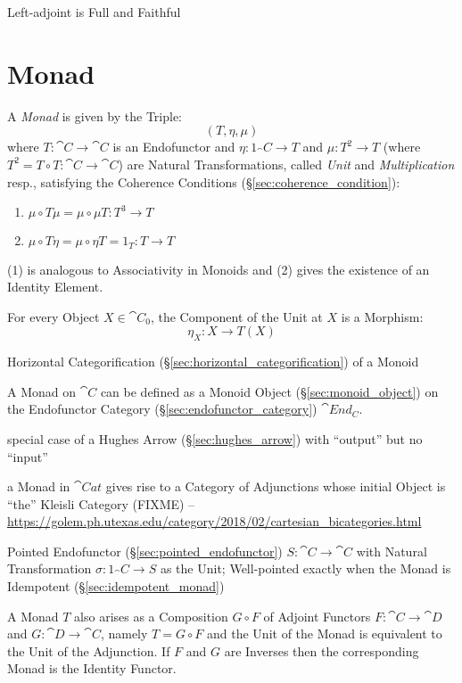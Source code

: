\cite{winskel-nielsen93}

Left-adjoint is Full and Faithful



\section{Monad}\label{sec:monad}

A \emph{Monad} is given by the Triple:
\[
  (T, \eta, \mu)
\]
where $T : \cat{C} \rightarrow \cat{C}$ is an Endofunctor and $\eta :
1_\cat{C} \rightarrow T$ and $\mu : T^2 \rightarrow T$ (where $T^2 = T
\circ T : \cat{C} \rightarrow \cat{C}$) are Natural Transformations,
called \emph{Unit} and \emph{Multiplication} resp., satisfying the
Coherence Conditions (\S\ref{sec:coherence_condition}):
\begin{enumerate}
  \item $\mu \circ T\mu = \mu \circ \mu T : T^3 \rightarrow T$
  \item $\mu \circ T\eta = \mu \circ \eta T = 1_T : T \rightarrow T$
\end{enumerate}
(1) is analogous to Associativity in Monoids and (2) gives the
existence of an Identity Element.

For every Object $X \in \cat{C}_0$, the Component of the Unit at $X$
is a Morphism:
\[
  \eta_X : X \rightarrow T (X)
\]

Horizontal Categorification (\S\ref{sec:horizontal_categorification})
of a Monoid

A Monad on $\cat{C}$ can be defined as a Monoid Object
(\S\ref{sec:monoid_object}) on the Endofunctor Category
(\S\ref{sec:endofunctor_category}) $\cat{End_C}$.

special case of a Hughes Arrow (\S\ref{sec:hughes_arrow}) with
``output'' but no ``input''

a Monad in $\cat{Cat}$ gives rise to a Category of Adjunctions whose initial
Object is ``the'' Kleisli Category (FIXME)
--\url{https://golem.ph.utexas.edu/category/2018/02/cartesian_bicategories.html}

Pointed Endofunctor (\S\ref{sec:pointed_endofunctor}) $S : \cat{C}
\rightarrow \cat{C}$ with Natural Transformation $\sigma : 1_\cat{C}
\rightarrow S$ as the Unit; Well-pointed exactly when the Monad is
Idempotent (\S\ref{sec:idempotent_monad})

A Monad $T$ also arises as a Composition $G \circ F$ of Adjoint
Functors $F : \cat{C} \rightarrow \cat{D}$ and $G : \cat{D}
\rightarrow \cat{C}$, namely $T = G \circ F$ and the Unit of the Monad
is equivalent to the Unit of the Adjunction. If $F$ and $G$ are
Inverses then the corresponding Monad is the Identity Functor.

